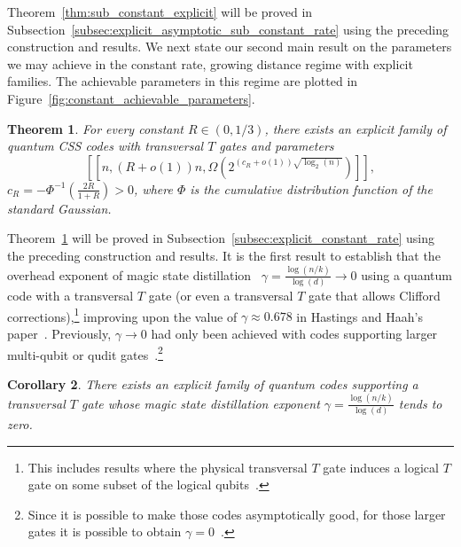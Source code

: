 \documentclass{article}
\newtheorem{theorem}{Theorem}
\newcounter{main}[section]
\newtheorem{corollary}[theorem]{Corollary}
\begin{document}
Theorem~\ref{thm:sub_constant_explicit} will be proved in Subsection~\ref{subsec:explicit_asymptotic_sub_constant_rate} using the preceding construction and results. We next state our second main result on the parameters we may achieve in the constant rate, growing distance regime with explicit families. The achievable parameters in this regime are plotted in Figure~\ref{fig:constant_achievable_parameters}.
\begin{theorem}\label{thm:constant_explicit} 
    For every constant $R \in (0,1/3)$, there exists an explicit family of quantum CSS codes with transversal $T$ gates and parameters
    \begin{equation}
        \left[\left[n,\left(R + o(1)\right)n,\Omega\left(2^{\left(c_R + o(1)\right)\sqrt{\log_2(n)}}\right)\right]\right],
    \end{equation}
    $c_R = -\Phi^{-1}\left(\frac{2R}{1+R}\right) > 0$, where $\Phi$ is the cumulative distribution function of the standard Gaussian.
\end{theorem}
Theorem~\ref{thm:constant_explicit} will be proved in Subsection~\ref{subsec:explicit_constant_rate} using the preceding construction and results. It is the first result to establish that the overhead exponent of magic state distillation~\cite{bravyi2012magic} $\gamma = \frac{\log(n/k)}{\log(d)} \to 0$ using a quantum code with a transversal $T$ gate (or even a transversal $T$ gate that allows Clifford corrections),\footnote{This includes results where the physical transversal $T$ gate induces a logical $T$ gate on some subset of the logical qubits~\cite{reddy2026realizing}.} improving upon the value of $\gamma \approx 0.678$ in Hastings and Haah's paper~\cite{hastings2018distillation}. Previously, $\gamma\to 0$ had only been achieved with codes supporting larger multi-qubit or qudit gates~\cite{krishna2018towards,wills2024,golowich2025asymptotically,nguyen2024good,nguyen2025quantum}.\footnote{Since it is possible to make those codes asymptotically good, for those larger gates it is possible to obtain $\gamma = 0$~\cite{wills2024,golowich2025asymptotically,nguyen2024good}.}
\begin{corollary}
    There exists an explicit family of quantum codes supporting a transversal $T$ gate whose magic state distillation exponent $\gamma = \frac{\log(n/k)}{\log(d)}$ tends to zero.
\end{corollary}
\end{document}
